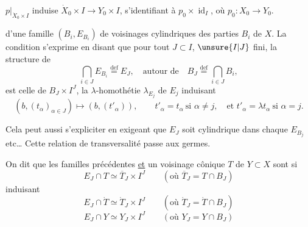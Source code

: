 $p|_{\dot X_0\times I}$ induise $\dot X_0\times I\longrightarrow Y_0\times I$,
s'identifiant à $p_0\times\operatorname{id}_I$, où $p_0:X_0\longrightarrow Y_0$.

 d'une famille 
$(B_i,E_{B_i})$ de voisinages cylindriques des parties $B_i$ de $X$.
La condition s'exprime en disant que pour
tout $J\subset I$, $\unsure{I|J}$ fini, la structure de
\[
\bigcap_{i\in J}E_{B_i}\overset{\mathrm{def}}=E_J,
\quad\text{autour de}\quad
B_J\overset{\mathrm{def}}=\bigcap_{i\in J}B_i,
\]
est celle de $B_J\times I^J$, la $\lambda$-homothétie
$\lambda_{E_j}$ de $E_j$  induisant
\[
(b,(t_\alpha)_{\alpha\in J})\longmapsto(b,(t'_\alpha)),
\qquad
t'_\alpha=t_\alpha\ \text{si }\alpha\ne j,\quad
\text{et }t'_\alpha=\lambda t_\alpha\ \text{si }\alpha=j.
\]

Cela peut aussi s'expliciter en exigeant
que $E_J$ soit cylindrique dans chaque $E_{B_j}$ etc\ldots
Cette relation de transversalité passe aux germes.

On dit que les familles précédentes \uline{et}
un voisinage cônique $T$ de $Y\subset X$ sont
 
si 
\[
E_J\cap T\simeq\overline T_J\times I^J
\qquad(\text{où }\overline T_J=T\cap B_J)
\]
induisant
\[
E_J\cap\dot T\simeq\dot T_J\times I^J
\qquad(\text{où }\dot T_J=\dot T\cap B_J)
\]
\[
E_J\cap Y\simeq Y_J\times I^J
\qquad(\text{où }Y_J=Y\cap B_J)
\]
